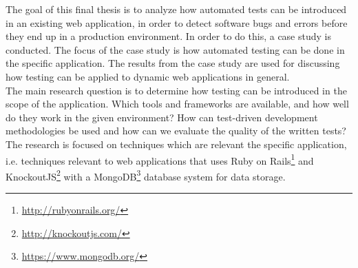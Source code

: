 
The goal of this final thesis is to analyze how automated tests can be
introduced in an existing web application, in order to detect software
bugs and errors before they end up in a production environment. In order
to do this, a case study is conducted. The focus of the case study is
how automated testing can be done in the specific application. The
results from the case study are used for discussing how testing can be
applied to dynamic web applications in general.\\

The main research question is to determine how testing can be introduced
in the scope of the application. Which tools and frameworks are
available, and how well do they work in the given environment? How can
test-driven development methodologies be used and how can we evaluate
the quality of the written tests? The research is focused on techniques
which are relevant the specific application, i.e. techniques relevant
to web applications that uses Ruby on
Rails\footnote{\url{http://rubyonrails.org/}} and
KnockoutJS\footnote{\url{http://knockoutjs.com/}} with a
MongoDB\footnote{\url{https://www.mongodb.org/}} database system for
data storage.\\
